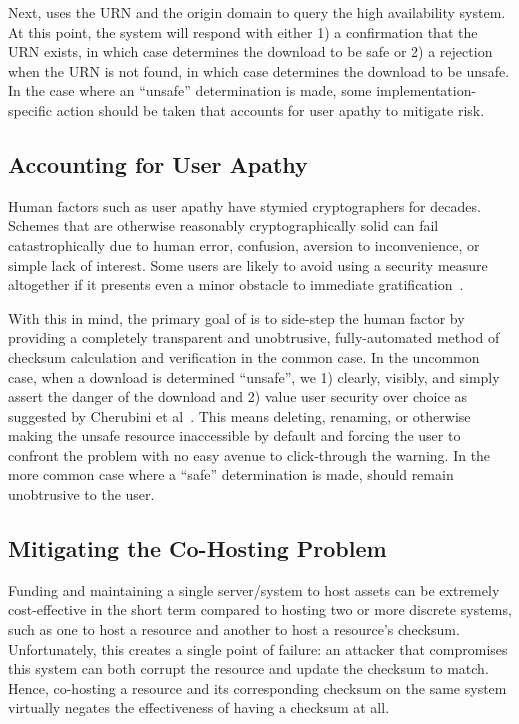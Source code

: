 Next, \SYSTEM{} uses the URN and the origin domain to query the high
availability system. At this point, the system will respond with either 1) a
confirmation that the URN exists, in which case \SYSTEM{} determines the
download to be safe or 2) a rejection when the URN is not found, in which case
\SYSTEM{} determines the download to be unsafe. In the case where an ``unsafe''
determination is made, some implementation-specific action should be taken that
accounts for user apathy to mitigate risk.

\subsection{Accounting for User Apathy}

Human factors such as user apathy have stymied cryptographers for decades.
Schemes that are otherwise reasonably cryptographically solid can fail
catastrophically due to human error, confusion, aversion to inconvenience, or
simple lack of interest. Some users are likely to avoid using a security measure
altogether if it presents even a minor obstacle to immediate
gratification~\cite{Clickthrough, PGPBad, Egelman1, Egelman2, Jenkins, Modic,
Reeder, Silic, Sunshine, Bianchi, Akhawe, Cherubini}.

With this in mind, the primary goal of \SYSTEM{} is to side-step the human
factor by providing a completely transparent and unobtrusive, fully-automated
method of checksum calculation and verification in the common case. In the
uncommon case, when a download is determined ``unsafe'', we 1) clearly, visibly,
and simply assert the danger of the download and 2) value user security over
choice as suggested by Cherubini et al~\cite{Cherubini}. This means deleting,
renaming, or otherwise making the unsafe resource inaccessible by default and
forcing the user to confront the problem with no easy avenue to click-through
the warning. In the more common case where a ``safe'' determination is made,
\SYSTEM{} should remain unobtrusive to the user.

\subsection{Mitigating the Co-Hosting Problem}

Funding and maintaining a single server/system to host assets can be extremely
cost-effective in the short term compared to hosting two or more discrete
systems, such as one to host a resource and another to host a resource's
checksum. Unfortunately, this creates a single point of failure: an attacker
that compromises this system can both corrupt the resource and update the
checksum to match. Hence, co-hosting a resource and its corresponding checksum
on the same system virtually negates the effectiveness of having a checksum at
all.

